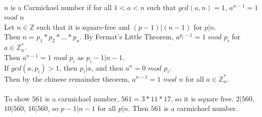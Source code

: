\documentclass{assignment}
\begin{document}
\begin{problemlist}
\pbitem
\begin{problem}
\end{problem}
\begin{answer}
  \\
  $n$ is a Carmichael number if for all $1<a<n$ such that $gcd(a,n)=1$, $a^{n-1}=1$ $mod$ $n$\\
  Let $n\in \mathbb{Z}$ such that it is square-free and $(p-1)|(n-1)$ for $p|n$.\\
  Then $n=p_1*p_2*...*p_n$. By Fermat's Little Theorem, $a^{p_i-1}=1$ $mod$ $p_i$ for $a\in \mathbb{Z}_n^*$.\\
  Then $a^{n-1} = 1$ $mod$ $p_i$ as $p_i-1|n-1$.\\
  If $gcd(a,p_i) > 1$, then $p_i | a$, and then $a^n=0$ $mod$ $p_i$.\\
  Then by the chinese remainder theorem, $a^{n-1} = 1$ $mod$ $n$ for all $a\in \mathbb{Z}_n^*$.\\\\
  To show $561$ is a carmichael number, $561=3*11*17$, so it is square free. $2 | 560$, $10 | 560$, $16 | 560$, so $p-1 | n-1$ for all $p|n$. Then $561$ is a carmichael number.
\end{answer}


\end{problemlist}
\end{document}
